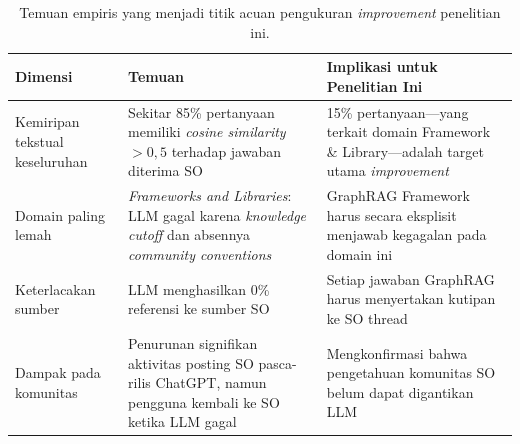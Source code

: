 
\begin{table}[h!]
\centering
\caption{Temuan empiris \textcite{DaSilva2025} yang menjadi titik acuan
pengukuran \emph{improvement} penelitian ini.}
\label{tab:bukti-empiris-baseline}
\begin{tabularx}{\textwidth}{|l|X|X|}
\hline
\textbf{Dimensi} & \textbf{Temuan} & \textbf{Implikasi untuk Penelitian Ini} \\
\hline
Kemiripan tekstual keseluruhan &
Sekitar 85\% pertanyaan memiliki \emph{cosine similarity} $> 0{,}5$
terhadap jawaban diterima SO &
15\% pertanyaan—yang terkait domain Framework \& Library—adalah target
utama \emph{improvement} \\
\hline
Domain paling lemah &
\emph{Frameworks and Libraries}: LLM gagal karena \emph{knowledge
cutoff} dan absennya \emph{community conventions} &
GraphRAG Framework harus secara eksplisit menjawab kegagalan pada domain ini \\
\hline
Keterlacakan sumber &
LLM menghasilkan 0\% referensi ke sumber SO &
Setiap jawaban GraphRAG harus menyertakan kutipan ke SO thread \\
\hline
Dampak pada komunitas &
Penurunan signifikan aktivitas posting SO pasca-rilis ChatGPT, namun
pengguna kembali ke SO ketika LLM gagal &
Mengkonfirmasi bahwa pengetahuan komunitas SO belum dapat digantikan LLM \\
\hline
\end{tabularx}
\end{table}